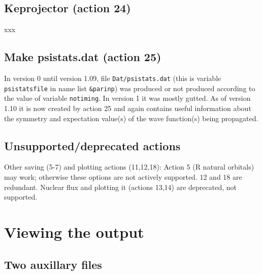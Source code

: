 \documentclass[10pt,leqno, oneside]{book}
\begin{document}
\section{Keprojector (action 24)}

xxx


\section{Make psistats.dat (action 25)}

In version 0 until version 1.09, file \verb#Dat/psistats.dat# (this is variable \verb#psistatsfile# in name list \verb#&parinp#) was produced or not produced
according to the value of variable \verb#notiming#.  In version 1 it was mostly gutted.  As of version 1.10 it is now created by action 25 and again
contains useful information about the symmetry and expectation value(s) of the wave function(s) being propagated.  

\section{Unsupported/deprecated actions}

Other saving (5-7) and plotting actions (11,12,18):
Action 5 (R natural orbitals) may work; otherwise these options are not actively supported.  12 and 18 are redundant.
Nuclear flux and plotting it (actions 13,14) are deprecated, not supported.


\chapter{Viewing the output}

\section{Two auxillary files}
\end{document}
